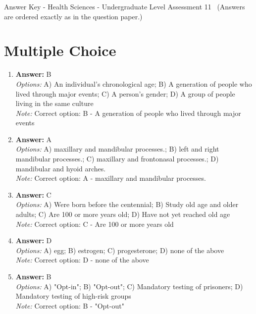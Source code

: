 \documentclass[12pt]{article}
\begin{document}
\begin{center}
Answer Key - Health Sciences - Undergraduate Level Assessment 11 \
\small (Answers are ordered exactly as in the question paper.)
\end{center}

\section*{Multiple Choice}
\begin{enumerate}[label=\arabic*.]
\item \textbf{Answer:} B
\\ \textit{Options:} A) An individual's chronological age; B) A generation of people who lived through major events; C) A person's gender; D) A group of people living in the same culture
\\ \textit{Note:} Correct option: B - A generation of people who lived through major events
\item \textbf{Answer:} A
\\ \textit{Options:} A) maxillary and mandibular processes.; B) left and right mandibular processes.; C) maxillary and frontonasal processes.; D) mandibular and hyoid arches.
\\ \textit{Note:} Correct option: A - maxillary and mandibular processes.
\item \textbf{Answer:} C
\\ \textit{Options:} A) Were born before the centennial; B) Study old age and older adults; C) Are 100 or more years old; D) Have not yet reached old age
\\ \textit{Note:} Correct option: C - Are 100 or more years old
\item \textbf{Answer:} D
\\ \textit{Options:} A) egg; B) estrogen; C) progesterone; D) none of the above
\\ \textit{Note:} Correct option: D - none of the above
\item \textbf{Answer:} B
\\ \textit{Options:} A) "Opt-in"; B) "Opt-out"; C) Mandatory testing of prisoners; D) Mandatory testing of high-risk groups
\\ \textit{Note:} Correct option: B - "Opt-out"
\end{enumerate}
\end{document}
